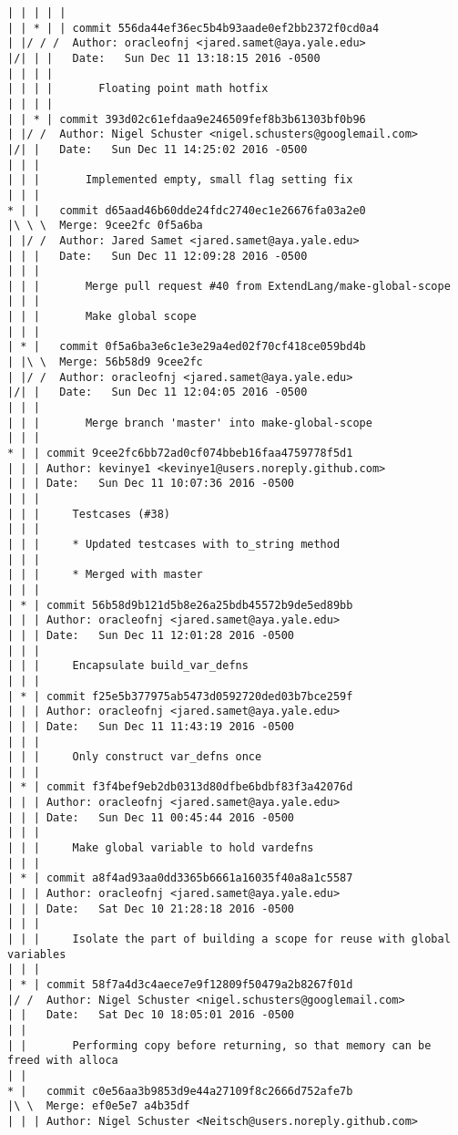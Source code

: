 \begin{lstlisting}
| | | | |      
| | * | | commit 556da44ef36ec5b4b93aade0ef2bb2372f0cd0a4
| |/ / /  Author: oracleofnj <jared.samet@aya.yale.edu>
|/| | |   Date:   Sun Dec 11 13:18:15 2016 -0500
| | | |   
| | | |       Floating point math hotfix
| | | |     
| | * | commit 393d02c61efdaa9e246509fef8b3b61303bf0b96
| |/ /  Author: Nigel Schuster <nigel.schusters@googlemail.com>
|/| |   Date:   Sun Dec 11 14:25:02 2016 -0500
| | |   
| | |       Implemented empty, small flag setting fix
| | |      
* | |   commit d65aad46b60dde24fdc2740ec1e26676fa03a2e0
|\ \ \  Merge: 9cee2fc 0f5a6ba
| |/ /  Author: Jared Samet <jared.samet@aya.yale.edu>
| | |   Date:   Sun Dec 11 12:09:28 2016 -0500
| | |   
| | |       Merge pull request #40 from ExtendLang/make-global-scope
| | |       
| | |       Make global scope
| | |      
| * |   commit 0f5a6ba3e6c1e3e29a4ed02f70cf418ce059bd4b
| |\ \  Merge: 56b58d9 9cee2fc
| |/ /  Author: oracleofnj <jared.samet@aya.yale.edu>
|/| |   Date:   Sun Dec 11 12:04:05 2016 -0500
| | |   
| | |       Merge branch 'master' into make-global-scope
| | |    
* | | commit 9cee2fc6bb72ad0cf074bbeb16faa4759778f5d1
| | | Author: kevinye1 <kevinye1@users.noreply.github.com>
| | | Date:   Sun Dec 11 10:07:36 2016 -0500
| | | 
| | |     Testcases (#38)
| | |     
| | |     * Updated testcases with to_string method
| | |     
| | |     * Merged with master
| | |    
| * | commit 56b58d9b121d5b8e26a25bdb45572b9de5ed89bb
| | | Author: oracleofnj <jared.samet@aya.yale.edu>
| | | Date:   Sun Dec 11 12:01:28 2016 -0500
| | | 
| | |     Encapsulate build_var_defns
| | |    
| * | commit f25e5b377975ab5473d0592720ded03b7bce259f
| | | Author: oracleofnj <jared.samet@aya.yale.edu>
| | | Date:   Sun Dec 11 11:43:19 2016 -0500
| | | 
| | |     Only construct var_defns once
| | |    
| * | commit f3f4bef9eb2db0313d80dfbe6bdbf83f3a42076d
| | | Author: oracleofnj <jared.samet@aya.yale.edu>
| | | Date:   Sun Dec 11 00:45:44 2016 -0500
| | | 
| | |     Make global variable to hold vardefns
| | |    
| * | commit a8f4ad93aa0dd3365b6661a16035f40a8a1c5587
| | | Author: oracleofnj <jared.samet@aya.yale.edu>
| | | Date:   Sat Dec 10 21:28:18 2016 -0500
| | | 
| | |     Isolate the part of building a scope for reuse with global variables
| | |    
| * | commit 58f7a4d3c4aece7e9f12809f50479a2b8267f01d
|/ /  Author: Nigel Schuster <nigel.schusters@googlemail.com>
| |   Date:   Sat Dec 10 18:05:01 2016 -0500
| |   
| |       Performing copy before returning, so that memory can be freed with alloca
| |     
* |   commit c0e56aa3b9853d9e44a27109f8c2666d752afe7b
|\ \  Merge: ef0e5e7 a4b35df
| | | Author: Nigel Schuster <Neitsch@users.noreply.github.com>

\end{lstlisting}
